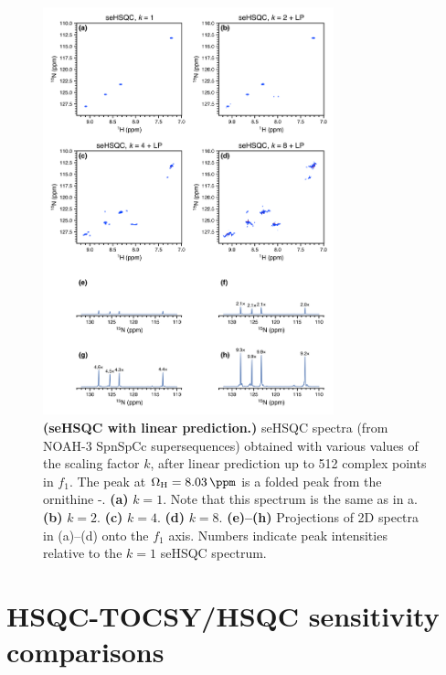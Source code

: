 \begin{figure}
    \centering
    \includegraphics[width=0.75\textwidth]{./figures/spv2_kscale_lp.png}
    \caption{
        \textbf{(seHSQC with linear prediction.)}
        \nitrogen{} seHSQC spectra (from NOAH-3 SpnSpCc supersequences) obtained with various values of the scaling factor $k$, after linear prediction up to 512 complex points in $f_1$.
        The peak at $\Omega_{\ce{H}} = \SI{8.03}{\ppm}$ is a folded peak from the ornithine \textdelta-.
        \textbf{(a)} $k = 1$. Note that this spectrum is the same as in a.
        \textbf{(b)} $k = 2$.
        \textbf{(c)} $k = 4$.
        \textbf{(d)} $k = 8$.
        \textbf{(e)--(h)} Projections of 2D spectra in (a)--(d) onto the $f_1$ axis.
        Numbers indicate peak intensities relative to the $k = 1$ seHSQC spectrum.
        \grami{}
    }
    \label{fig:spv2_kscale_lp}
\end{figure}

\section{HSQC-TOCSY/HSQC sensitivity comparisons}

